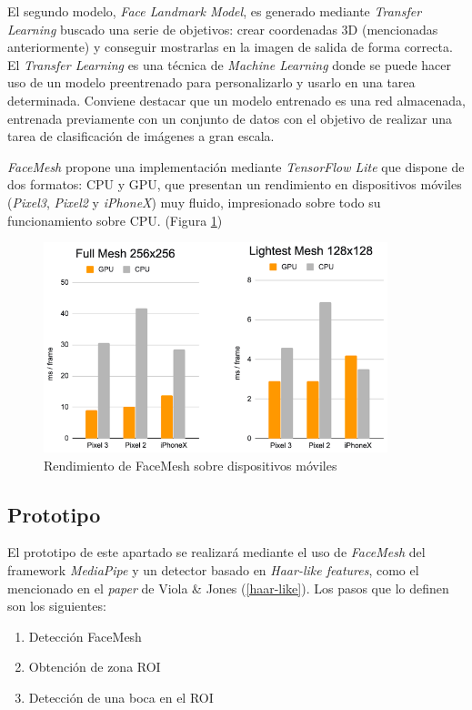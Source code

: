 El segundo modelo, \textit{Face Landmark Model}, es generado mediante \textit{Transfer Learning} buscado una serie de objetivos: crear coordenadas 3D (mencionadas anteriormente) y conseguir mostrarlas en la imagen de salida de forma correcta. \cite{faceMesh} El \textit{Transfer Learning} es una técnica de \textit{Machine Learning} donde se puede hacer uso de un modelo preentrenado para personalizarlo y usarlo en una tarea determinada. Conviene destacar que un modelo entrenado es una red almacenada, entrenada previamente con un conjunto de datos con el objetivo de realizar una tarea de clasificación de imágenes a gran escala. \cite{transferLearning}

\textit{FaceMesh} propone una implementación mediante \textit{TensorFlow Lite} que dispone de dos formatos: CPU y GPU, que presentan un rendimiento en dispositivos móviles (\textit{Pixel3}, \textit{Pixel2} y \textit{iPhoneX}) muy fluido, impresionado sobre todo su funcionamiento sobre CPU. (Figura \ref{fig:faceMeshRen}) \cite{faceMesh3}

\begin{figure}[htp]
	\centering
	\includegraphics[width=10cm]{imagenes/rendFaceMesh.png}
	\caption{Rendimiento de FaceMesh sobre dispositivos móviles}
	\label{fig:faceMeshRen}
\end{figure}


\subsection*{Prototipo}

El prototipo de este apartado se realizará mediante el uso de \textit{FaceMesh} del framework \textit{MediaPipe} y un detector basado en \textit{Haar-like features}, como el mencionado en el \textit{paper} de Viola \& Jones (\ref{haar-like}). Los pasos que lo definen son los siguientes:

\begin{enumerate}
	\item Detección FaceMesh
	\item Obtención de zona ROI
	\item Detección de una boca en el ROI 
\end{enumerate}

